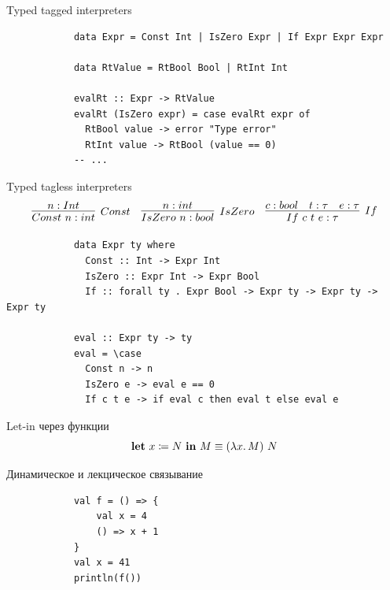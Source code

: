     \begin{frame}[fragile]{Typed tagged interpreters}
        \pause
        \begin{verbatim}
            data Expr = Const Int | IsZero Expr | If Expr Expr Expr

            data RtValue = RtBool Bool | RtInt Int

            evalRt :: Expr -> RtValue
            evalRt (IsZero expr) = case evalRt expr of
              RtBool value -> error "Type error"
              RtInt value -> RtBool (value == 0)
            -- ...
        \end{verbatim}
    \end{frame}

    \begin{frame}[fragile]{Typed tagless interpreters}
        \pause
        \begin{equation*}{}
            \infer[Const]{Const~n : int}{n : Int}
            \quad
            \infer[IsZero]{IsZero~n : bool}{n : int}
            \quad
            \infer[If]{If~c~t~e : \tau}{c : bool & t : \tau & e : \tau}
        \end{equation*}
        \pause
        \begin{verbatim}
            data Expr ty where
              Const :: Int -> Expr Int
              IsZero :: Expr Int -> Expr Bool
              If :: forall ty . Expr Bool -> Expr ty -> Expr ty -> Expr ty

            eval :: Expr ty -> ty
            eval = \case
              Const n -> n
              IsZero e -> eval e == 0
              If c t e -> if eval c then eval t else eval e
        \end{verbatim}
    \end{frame}


    \begin{frame}[fragile]{Let-in через функции}
        \pause
        \[
            \mathbf{let} ~ x \coloneqq N ~ \mathbf{in} ~ M \equiv (\lambda x\ldotp M) ~ N
        \]
    \end{frame}

    \begin{frame}[fragile]{Динамическое и лекцическое связывание}
        \pause
        \begin{verbatim}
            val f = () => {
                val x = 4
                () => x + 1
            }
            val x = 41
            println(f())
        \end{verbatim}
    \end{frame}

